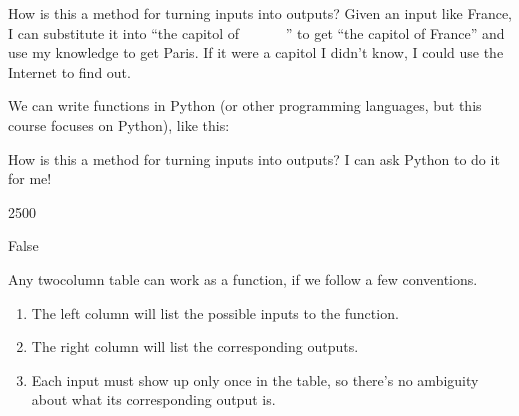 \documentclass[letterpaper,10pt,english]{jupyterBook}
\begin{document}
\sphinxAtStartPar
How is this a method for turning inputs into outputs?  Given an input like France, I can substitute it into “the capitol of        ” to get “the capitol of France” and use my knowledge to get Paris.  If it were a capitol I didn’t know, I could use the Internet to find out.

\sphinxAtStartPar
{} We can write functions in Python (or other programming languages, but this course focuses on Python), like this:

\begin{sphinxVerbatim}[commandchars=\\\{\}]
    
     

    
       
\end{sphinxVerbatim}

\sphinxAtStartPar
How is this a method for turning inputs into outputs?  I can ask Python to do it for me!

\begin{sphinxVerbatim}[commandchars=\\\{\}]
\end{sphinxVerbatim}

\begin{sphinxVerbatim}[commandchars=\\\{\}]
2500
\end{sphinxVerbatim}

\begin{sphinxVerbatim}[commandchars=\\\{\}]
  
\end{sphinxVerbatim}

\begin{sphinxVerbatim}[commandchars=\\\{\}]
False
\end{sphinxVerbatim}

\sphinxAtStartPar
{} Any two\sphinxhyphen{}column table can work as a function, if we follow a few conventions.
\begin{enumerate}
%
\item {} 
\sphinxAtStartPar
The left column will list the possible inputs to the function.

\item {} 
\sphinxAtStartPar
The right column will list the corresponding outputs.

\item {} 
\sphinxAtStartPar
Each input must show up only once in the table, so there’s no ambiguity about what its corresponding output is.

\end{enumerate}
\end{document}
